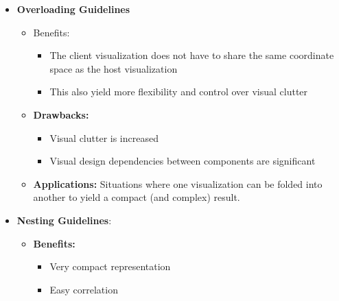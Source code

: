 \documentclass{report}
\begin{document}
\begin{itemize}
\begin{itemize}
                    \begin{itemize}
                        \item May cause occlusion and high visual clutter.
                        \item The client visualization must share the same spatial mapping as the host visualization.
                    \end{itemize}
                \item \textbf{Applications:} In settings where comparison is common, or where the component visualization views need to be as large as possible (potentially the entire available space).
            \end{itemize}
        \item \textbf{Overloading Guidelines}
            \begin{itemize}
                \item Benefits:
                    \begin{itemize}
                        \item The client visualization does not have to share the same coordinate space as the host visualization
                        \item This also yield more flexibility and control over visual clutter
                    \end{itemize}
                \item \textbf{Drawbacks:}
                    \begin{itemize}
                        \item Visual clutter is increased
                        \item Visual design dependencies between components are significant
                    \end{itemize}
                \item \textbf{Applications:} Situations where one visualization can be folded into another to yield a compact (and complex) result.
            \end{itemize}
        \item \textbf{Nesting Guidelines}: 
            \begin{itemize}
                \item \textbf{Benefits:}
                    \begin{itemize}
                        \item Very compact representation
                        \item Easy correlation

\end{itemize}
\end{itemize}
\end{itemize}
\end{document}

